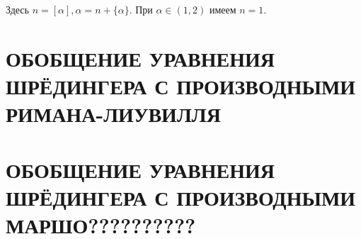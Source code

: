 \documentclass[a4paper, fontsize=14pt]{article}
\begin{document}
Здесь $n=[\alpha], \alpha = n + \{ \alpha \}$. При $\alpha \in (1, 2)$ имеем $n=1$. 

\section[Обобщение уравнения Шрёдингера с производными Римана-Лиувилля]{ОБОБЩЕНИЕ УРАВНЕНИЯ ШРЁДИНГЕРА С ПРОИЗВОДНЫМИ РИМАНА-ЛИУВИЛЛЯ}


\section[Обобщение уравнения  Шрёдингера с производными Маршо]{ОБОБЩЕНИЕ УРАВНЕНИЯ ШРЁДИНГЕРА С ПРОИЗВОДНЫМИ МАРШО??????????}
\end{document}
